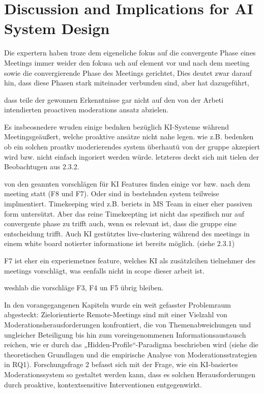 \section{Discussion and Implications for AI System Design}
\label{sec:interview-implications}

Die expertern haben troze dem eigeneliche fokus auf die convergente Phase eines Meetings immer weider den
fokusa uch auf element vor und nach dem meeting sowie die convergierende Phase des Meetings gerichtet,
Dies deutet zwar darauf hin, dass diese Phasen stark miteinader verbunden sind, aber hat dazugeführt,

dass teile der gewonnen Erkenntnisse gar nicht auf den von der Arbeti intendierten proactiven moderations
ansatz abzielen.

Es insbeosnedere wruden einige bednken bezüglich KI-Systeme während Meetingsgeäußert, welche proaktive
ansätze nicht nahe legen. wie z.B. bedenken ob ein solchen proatkv moderierendes system überhautü von der
gruppe akzepiert wird bzw. nicht einfach ingoriert werden würde. letzteres deckt sich mit tielen der
Beobachtugen aus 2.3.2.

von den geannten vorschlägen für KI Features finden einige vor bzw. nach dem meeting statt (F8 und F7). Oder
sind in bestehnden system teilweise implmentiert. Timekeeping wird z.B. beriets in MS Team in einer eher
passiven form untersützt. Aber das reine Timekeepting ist nicht das spezifisch nur auf convergente phase zu
trifft auch, wenn es relevant ist, dass die gruppe eine entscheidung trifft. Auch KI gestütztes
live-clustering während des meetings in einem white board
notierter informatione ist
bereits möglich. (siehe 2.3.1)

F7 ist eher ein experiemetnes feature, welches KI als zusätzlcihen tielnehmer des meetings vorschlägt, was
eenfalls nicht in scope dieser arbeit ist.

weshlab die vorschläge F3, F4 un F5 übrig bleiben.

In den vorangegangenen Kapiteln wurde ein weit gefasster Problemraum abgesteckt: Zielorientierte
Remote-Meetings sind mit einer Vielzahl von Moderationsherausforderungen konfrontiert, die von
Themenabweichungen und ungleicher Beteiligung bis hin zum voreingenommenen Informationsaustausch reichen, wie
er durch das „Hidden-Profile“-Paradigma beschrieben wird (siehe die theoretischen Grundlagen und die
empirische Analyse von Moderationsstrategien in RQ1). Forschungsfrage 2 befasst sich mit der Frage, wie ein
KI-basiertes Moderationssystem so gestaltet werden kann, dass es solchen Herausforderungen durch proaktive,
kontextsensitive Interventionen entgegenwirkt.


